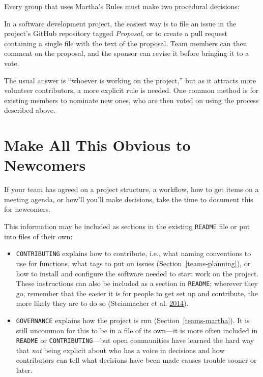 \documentclass[
]{krantz}
\providecommand{\tightlist}{%
  \setlength{\itemsep}{0pt}\setlength{\parskip}{0pt}}
\begin{document}
Every group that uses Martha's Rules must make two procedural decisions:

\begin{description}
\tightlist
\item[How are proposals put forward?]
In a software development project,
the easiest way is to file an issue in the project's GitHub repository
tagged \emph{Proposal},
or to create a pull request containing a single file
with the text of the proposal.
Team members can then comment on the proposal,
and the sponsor can revise it
before bringing it to a vote.
\item[Who gets to vote?]
The usual answer is ``whoever is working on the project,''
but as it attracts more volunteer contributors,
a more explicit rule is needed.
One common method is for existing members to nominate new ones,
who are then voted on using the process described above.
\end{description}

\hypertarget{teams-documentation}{%
\section{Make All This Obvious to Newcomers}\label{teams-documentation}}

If your team has agreed on a project structure,
a workflow,
how to get items on a meeting agenda, or
how'll you'll make decisions,
take the time to document this for newcomers.

This information may be included as sections in the existing \texttt{README} file
or put into files of their own:

\begin{itemize}
\item
  \texttt{CONTRIBUTING}
  explains how to contribute,
  i.e.,
  what naming conventions to use for functions,
  what tags to put on issues (Section~\ref{teams-planning}),
  or how to install and configure the software needed to start work on the project.
  These instructions can also be included as a section in \texttt{README};
  wherever they go,
  remember that the easier it is for people to get set up and contribute,
  the more likely they are to do so (Steinmacher et al. \protect\hyperlink{ref-Stei2014}{2014}).
\item
  \texttt{GOVERNANCE}
  explains how the project is run (Section~\ref{teams-martha}).
  It is still uncommon for this to be in a file of its own---it is more often included
  in \texttt{README} or \texttt{CONTRIBUTING}---but open communities have learned the hard way
  that \emph{not} being explicit about who has a voice in decisions
  and how contributors can tell what decisions have been made
  causes trouble sooner or later.
\end{itemize}
\end{document}
